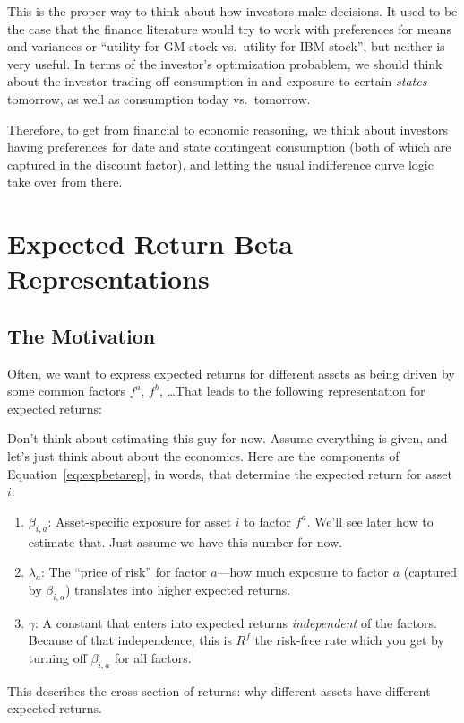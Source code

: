 \documentclass[12pt]{article}
\theoremstyle{plain}
\theoremstyle{definition}
\theoremstyle{remark}
\begin{document}
This is the proper way to think about how investors make decisions. It
used to be the case that the finance literature would try to work with
preferences for means and variances or ``utility for GM stock vs.\
utility for IBM stock'', but neither is very useful. In terms of the
investor's optimization probablem, we should think about the investor
trading off consumption in and exposure to certain \emph{states}
tomorrow, as well as consumption today vs.\ tomorrow.

Therefore, to get from financial to economic reasoning, we think about
investors having preferences for date and state contingent consumption
(both of which are captured in the discount factor), and letting the
usual indifference curve logic take over from there.

\section{Expected Return Beta Representations}

\subsection{The Motivation}

Often, we want to express expected returns for different assets as
being driven by some common factors $f^a$, $f^b$, \ldots That leads to
the following representation for expected returns:

Don't think about estimating this guy for now. Assume everything is
given, and let's just think about about the economics. Here are the
components of Equation~\ref{eq:expbetarep}, in words, that determine the
expected return for asset $i$:
\begin{enumerate}
  \item $\beta_{i,a}$: Asset-specific exposure for asset $i$ to
    factor $f^a$. We'll see later how to estimate that. Just assume
    we have this number for now.
  \item $\lambda_a$: The ``price of risk'' for factor $a$---how much
    exposure to factor $a$ (captured by $\beta_{i,a}$) translates into
    higher expected returns.
  \item $\gamma$: A constant that enters into expected returns
    \emph{independent} of the factors. Because of that independence,
    this is $R^f$ the risk-free rate which you get by turning off
    $\beta_{i,a}$ for all factors.
\end{enumerate}
This describes the cross-section of returns: why different assets have
different expected returns.
\end{document}
